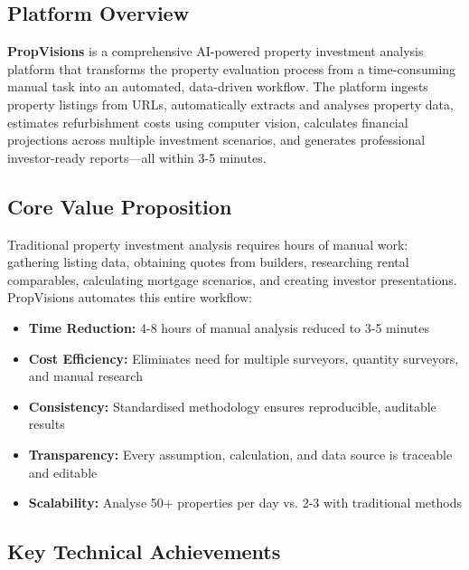 \documentclass[11pt,a4paper]{article}
\begin{document}
\subsection{Platform Overview}

\textbf{PropVisions} is a comprehensive AI-powered property investment analysis platform that transforms the property evaluation process from a time-consuming manual task into an automated, data-driven workflow. The platform ingests property listings from URLs, automatically extracts and analyses property data, estimates refurbishment costs using computer vision, calculates financial projections across multiple investment scenarios, and generates professional investor-ready reports—all within 3-5 minutes.

\subsection{Core Value Proposition}

Traditional property investment analysis requires hours of manual work: gathering listing data, obtaining quotes from builders, researching rental comparables, calculating mortgage scenarios, and creating investor presentations. PropVisions automates this entire workflow:

\begin{itemize}
  \item \textbf{Time Reduction:} 4-8 hours of manual analysis reduced to 3-5 minutes
  \item \textbf{Cost Efficiency:} Eliminates need for multiple surveyors, quantity surveyors, and manual research
  \item \textbf{Consistency:} Standardised methodology ensures reproducible, auditable results
  \item \textbf{Transparency:} Every assumption, calculation, and data source is traceable and editable
  \item \textbf{Scalability:} Analyse 50+ properties per day vs. 2-3 with traditional methods
\end{itemize}

\subsection{Key Technical Achievements}
\end{document}
